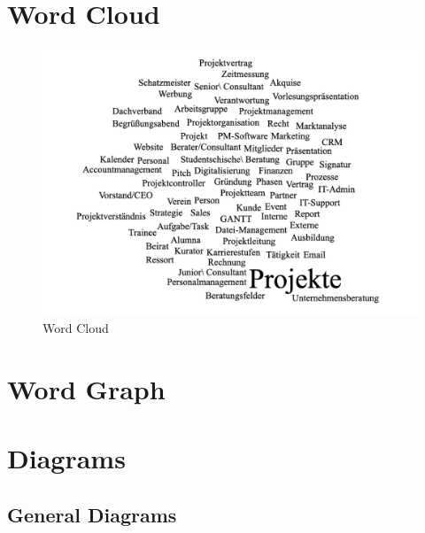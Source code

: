 \documentclass[a4paper, DIV=13, BCOR=0cm]{scrbook}
\begin{document}
\section{Word Cloud }
\label{word-cloud}
\begin{figure}[h]
	\caption{Word Cloud}
	\centering
	\includegraphics[width=1\textwidth]{Images/word-cloud.png}
\end{figure}
\newpage

\section{Word Graph }



\newpage
\section{Diagrams }
\subsection{General Diagrams}
\end{document}
